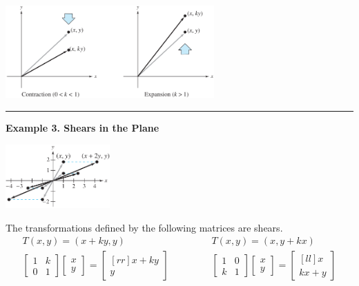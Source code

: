 \documentclass{article}
\begin{document}
    \begin{center}
        \includegraphics[width = 8cm]{images/expandY.png}
    \end{center}
    {\color{blue9} \rule{8cm}{0.3mm}}

    \textbf{Example 3. \textcolor{blue5}{Shears in the Plane}}

    \begin{minipage}{0.3\linewidth}
        \includegraphics[width = 4cm]{images/shear2d.png}
    \end{minipage}
    \begin{minipage}{0.61\linewidth}
        The transformations defined by the following matrices are shears.
        \begin{equation*}
            \begin{array}{cccc}
                T(x,y) = (x + ky, y) & \quad & \quad & T(x,y) = (x, y + kx) \\
                \begin{bmatrix}
                    1 & k \\
                    0 & 1
                \end{bmatrix} \begin{bmatrix}
                    x \\ y
                \end{bmatrix} =
                \begin{bmatrix}[rr]
                    x + ky \\
                    y
                \end{bmatrix} & \quad & \quad & 
                \begin{bmatrix}
                    1 & 0 \\
                    k & 1
                \end{bmatrix} \begin{bmatrix}
                    x \\ y
                \end{bmatrix}
                    =
                \begin{bmatrix}[ll]
                    x \\
                    kx + y
                \end{bmatrix}
            \end{array}
        \end{equation*}
    \end{minipage}
\end{document}
